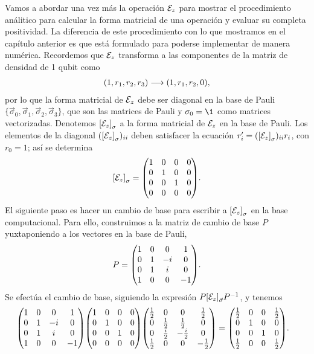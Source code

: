 Vamos a abordar una vez más la operación $\mathcal{E}_z$
para mostrar el procedimiento análitico para 
calcular la forma matricial de una operación 
y evaluar su completa positividad. La diferencia 
de este procedimiento con lo que mostramos en el
capítulo anterior es que está formulado para 
poderse implementar de manera numérica.
Recordemos que $\mathcal{E}_z$ transforma a las componentes 
de la matriz de densidad de 1 qubit como
\begin{align}
\qty(1,r_1,r_2,r_3)\longrightarrow\qty(1,r_1,r_2,0),
\end{align}
por lo que la forma matricial de $\mathcal{E}_z$ debe ser diagonal 
en la base de Pauli 
$\{ \vec{\sigma}_0,\vec{\sigma}_1,\vec{\sigma}_2,\vec{\sigma}_3\}$, 
que son las matrices de Pauli y $\sigma_0=\1$ como matrices vectorizadas.
Denotemos $\qty[\mathcal{E}_z]_{\sigma}$ a la forma matricial de
$\mathcal{E}_z$ en la base de Pauli. 
Los elementos de la diagonal $(\qty[\mathcal{E}_{z}]_{\sigma})_{ii}$ 
deben satisfacer la ecuación $r_i'=(\qty[\mathcal{E}_{z}]_{\sigma})_{ii}r_i$, 
con $r_0=1$; así se determina 
\begin{align}
\qty[\E_z]_{\sigma}=
\mqty(
 1 & 0 & 0 & 0 \\
 0 & 1 & 0 & 0 \\
 0 & 0 & 1 & 0 \\
 0 & 0 & 0 & 0 
).
\end{align}
El siguiente paso es hacer un cambio de base para escribir
a $\qty[\mathcal{E}_z]_{\sigma}$ en la base computacional.
Para ello, construimos a la matriz de cambio de base $P$
yuxtaponiendo a los vectores en la base de Pauli,
\begin{align}
P=\mqty(
 1 & 0 & 0 & 1 \\
 0 & 1 & -i & 0 \\
 0 & 1 & i & 0 \\
 1 & 0 & 0 & -1 
).
\end{align}
Se efectúa el cambio de base, siguiendo la expresión 
$P\qty[\mathcal{E}_z]_{\vec{\sigma}}P^{-1}$, y tenemos
\begin{align}
\mqty(
 1 & 0 & 0 & 1 \\
 0 & 1 & -i & 0 \\
 0 & 1 & i & 0 \\
 1 & 0 & 0 & -1 
)
\mqty(
 1 & 0 & 0 & 0 \\
 0 & 1 & 0 & 0 \\
 0 & 0 & 1 & 0 \\
 0 & 0 & 0 & 0 
)
\mqty(
 \frac{1}{2} & 0 & 0 & \frac{1}{2} \\
 0 & \frac{1}{2} & \frac{1}{2} & 0 \\
 0 & \frac{i}{2} & -\frac{i}{2} & 0 \\
 \frac{1}{2} & 0 & 0 & -\frac{1}{2} 
)
&=
\mqty(
 \frac{1}{2} & 0 & 0 & \frac{1}{2} \\
 0 & 1 & 0 & 0 \\
 0 & 0 & 1 & 0 \\
 \frac{1}{2} & 0 & 0 & \frac{1}{2} 
).
\end{align}
